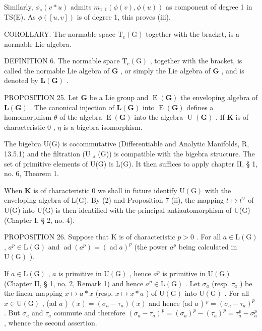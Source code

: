 Similarly, \(\phi_{*} (v * u)\) admits \(m_{1,1}(\phi(v), \phi(u))\) as component of degree 1 in TS(E). As \(\phi([u, v])\) is of degree 1, this proves (iii).

COROLLARY. The normable space \(\mathrm{T}_e(\mathrm{G})\) together with the bracket, is a normable Lie algebra.

DEFINITION 6. The normable space \(\mathrm{T_e(G)}\) , together with the bracket, is called the normable Lie algebra of \(\mathbf{G}\) , or simply the Lie algebra of \(\mathbf{G}\) , and is denoted by \(\mathbf{L(G)}\) .

PROPOSITION 25. Let \(\mathbf{G}\) be a Lie group and \(\operatorname{E}(\mathbf{G})\) the enveloping algebra of \(\mathbf{L}(\mathbf{G})\) . The canonical injection of \(\mathbf{L}(\mathbf{G})\) into \(\operatorname{E}(\mathbf{G})\) defines a homomorphism \(\theta\) of the algebra \(\operatorname{E}(\mathbf{G})\) into the algebra \(\operatorname{U}(\mathbf{G})\) . If \(\mathbf{K}\) is of characteristic \(0\) , \(\eta\) is a bigebra isomorphism.

The bigebra U(G) is cocommutative (Differentiable and Analytic Manifolds, R, 13.5.1) and the filtration (U \(_{s}\) (G)) is compatible with the bigebra structure. The set of primitive elements of U(G) is L(G). It then suffices to apply chapter II, § 1, no. 6, Theorem 1.

When \(\mathbf{K}\) is of characteristic 0 we shall in future identify \(\mathrm{U}(\mathrm{G})\) with the enveloping algebra of L(G). By (2) and Proposition 7 (ii), the mapping \(t \mapsto t^{\vee}\) of U(G) into U(G) is then identified with the principal antiautomorphism of U(G) (Chapter I, § 2, no. 4).

PROPOSITION 26. Suppose that K is of characteristic \(p > 0\) . For all \(a \in \mathrm{L}(\mathrm{G})\) , \(a^p \in \mathrm{L}(\mathrm{G})\) and \(\operatorname{ad}(a^p) = (\operatorname{ad} a)^p\) (the power \(a^p\) being calculated in \(\mathrm{U}(\mathrm{G})\) ).

If \(a \in \mathrm{L}(\mathrm{G})\) , \(a\) is primitive in \(\mathrm{U}(\mathrm{G})\) , hence \(a^p\) is primitive in \(\mathrm{U}(\mathrm{G})\) (Chapter II, § 1, no. 2, Remark 1) and hence \(a^p \in \mathrm{L}(\mathrm{G})\) . Let \(\sigma_a\) (resp. \(\tau_a\) ) be the linear mapping \(x \mapsto a * x\) (resp. \(x \mapsto x * a\) ) of \(\mathrm{U}(\mathrm{G})\) into \(\mathrm{U}(\mathrm{G})\) . For all \(x \in \mathrm{U}(\mathrm{G})\) , (ad \(a\) ) \((x) = (\sigma_a - \tau_a)(x)\) and hence (ad \(a\) ) \(^p = (\sigma_a - \tau_a)^p\) . But \(\sigma_a\) and \(\tau_a\) commute and therefore \((\sigma_a - \tau_a)^p = (\sigma_a)^p - (\tau_a)^p = \tau_a^p - \sigma_a^p\) , whence the second assertion.


